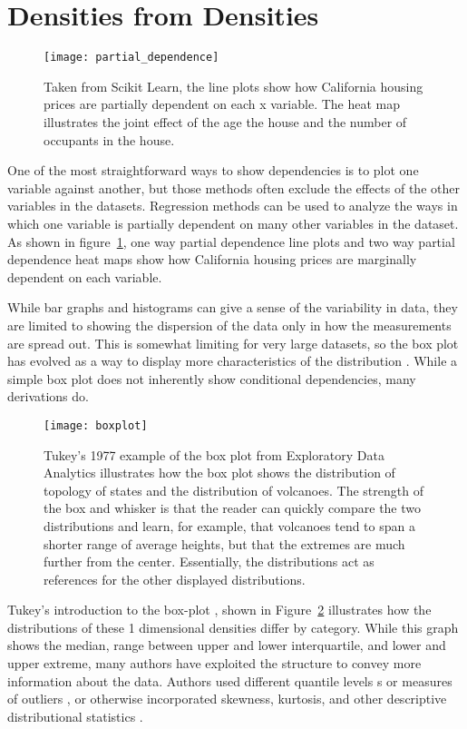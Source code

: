 \documentclass[../main.tex]{subfiles}
\begin{document}
\section{Densities from Densities}


\begin{figure}
  \texttt{[image: partial\_dependence]}
  \caption{Taken from Scikit Learn\cite{_partial_????}, the line plots show how California housing prices are partially dependent on each x variable. The heat map illustrates the joint effect of the age the house and the number of occupants in the house.}
  \label{fig:partialdependence}
\end{figure}


One of the most straightforward ways to show dependencies is to plot one
variable against another, but those methods often exclude the effects of the
other variables in the datasets. Regression methods can be used to analyze the
ways in which one variable is partially dependent on many other variables in
the dataset\cite{_elements_2009}. As shown in figure~\ref{fig:partialdependence}, one way partial dependence line plots and two way partial dependence heat maps show how California housing prices are marginally dependent on each variable. 

While bar graphs and histograms can give a sense of the variability in
data, they are limited to showing the dispersion of the data only in how the measurements are spread out. This is somewhat limiting for very large datasets, so the box plot has evolved as a way to display more characteristics of the distribution \cite{wickham_40_2011}. While a simple box plot does not inherently show conditional dependencies, many derivations do. 

\begin{figure}
  \texttt{[image: boxplot]}
  \caption{Tukey's 1977 example of the box plot from
    Exploratory Data Analytics\cite{tukey_exploratory_1977} illustrates how the box plot shows the distribution of topology of states and
    the distribution of volcanoes. The strength of the box and whisker is that the
    reader can quickly compare the two distributions and learn, for example,
    that volcanoes tend to span a shorter range of average heights, but that the
    extremes are much further from the center. Essentially, the distributions act as references for the other displayed distributions.}
  \label{fig:boxplot}
\end{figure}

Tukey's introduction to the box-plot \cite{tukey_exploratory_1977}, shown in
Figure~\ref{fig:boxplot} illustrates how the distributions of these 1 dimensional densities differ by category. While this graph shows the median, range between upper and lower interquartile, and lower and upper extreme, many authors have exploited the structure to convey more information about the data. Authors used different quantile levels \cite{hyndman_sample_1996}s or measures of outliers
\cite{frigge_implementations_1989, schwertman_identifying_2007}, or otherwise incorporated skewness, kurtosis, and other descriptive distributional statistics \cite{kim_more_2004, marmolejo-ramos_shifting_2015}.
\end{document}
